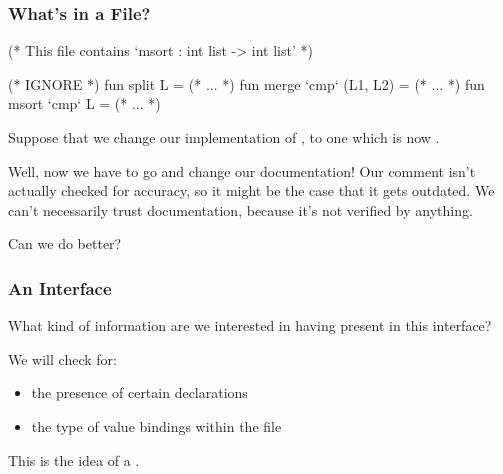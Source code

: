 \documentclass[aspectratio=169]{beamer}
\begin{document}
\begin{frame}[fragile]
  \frametitle{What's in a File?}

  \begin{codeblock}
    (* This file contains `msort : int list -> int list' *)

    (* IGNORE *)
    fun split L = (* ... *)
    fun merge `cmp` (L1, L2) = (* ... *)
    fun msort `cmp` L = (* ... *)
  \end{codeblock}

  Suppose that we change our implementation of , to one 
  which is now .

  \vspace{\fill}

  Well, now we have to go and change our documentation! Our comment
  isn't actually checked for accuracy, so it might be the case that it
  gets outdated. We can't necessarily trust documentation, because it's
  not verified by anything.

  Can we do better?
\end{frame}

\begin{frame}[fragile]
  \frametitle{An Interface}


  \vspace{\fill}

  What kind of information are we interested in having present in this interface?

  \vspace{\fill}

  We will check for:
  \begin{itemize}
    \item the presence of certain declarations
    \item the type of value bindings within the file
  \end{itemize}

  \vspace{\fill}

  This is the idea of a .
\end{frame}

\end{document}
